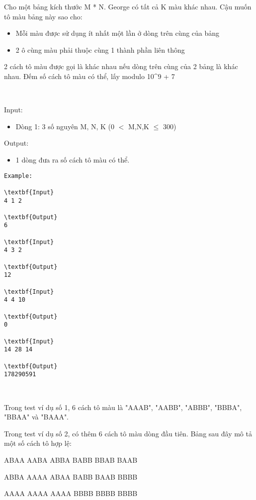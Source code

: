 

Cho một bảng kích thước M * N. George có tất cả K màu khác nhau. Cậu muốn tô màu bảng này sao cho:
\begin{itemize}
	\item 

Mỗi màu được sử dụng ít nhất một lần ở dòng trên cùng của bảng
	\item 

2 ô cùng màu phải thuộc cùng 1 thành phần liên thông
\end{itemize}

2 cách tô màu được gọi là khác nhau nếu dòng trên cùng của 2 bảng là khác nhau. Đếm số cách tô màu có thể, lấy modulo 10^9 + 7




 

Input:
\begin{itemize}
	\item 

Dòng 1: 3 số nguyên M, N, K (0 $<$ M,N,K  $\le$  300)
\end{itemize}

Output:
\begin{itemize}
	\item 

1 dòng đưa ra số cách tô màu có thể.
\end{itemize}
\begin{verbatim}
Example:

\textbf{Input}
4 1 2

\textbf{Output}
6

\textbf{Input}
4 3 2

\textbf{Output}
12

\textbf{Input}
4 4 10

\textbf{Output}
0

\textbf{Input}
14 28 14

\textbf{Output}
178290591\end{verbatim}




 

Trong test ví dụ số 1, 6 cách tô màu là "AAAB", "AABB", "ABBB", "BBBA", "BBAA" và "BAAA".

Trong test ví dụ số 2, có thêm 6 cách tô màu dòng đầu tiên. Bảng sau đây mô tả một số cách tô hợp lệ:

ABAA AABA ABBA BABB BBAB BAAB

ABBA AAAA ABAA BABB BAAB BBBB

AAAA AAAA AAAA BBBB BBBB BBBB




 
